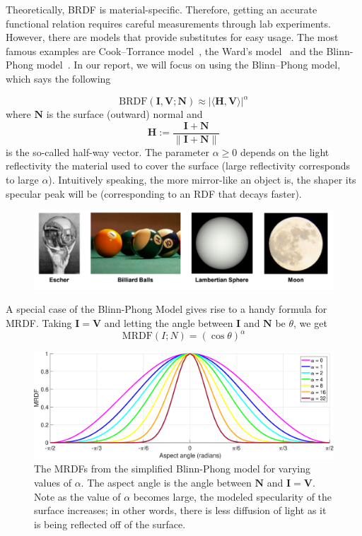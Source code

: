 \documentclass[11pt]{amsart}
\newcommand{\BRDF}{\mathrm{BRDF}}
\newcommand{\MRDF}{\mathrm{MRDF}}
\newcommand{\ip}[2]{\langle {#1}, {#2} \rangle}
\theoremstyle{definition}
\begin{document}
Theoretically, BRDF is material-specific. Therefore, getting an accurate functional
relation requires careful measurements through lab experiments. However, there
are models that provide substitutes for easy usage. The most famous examples
are Cook--Torrance model~\cite{CookTorr}, the Ward's model~\cite{Ward} and the
Blinn-Phong model~\cite{BlinnPhong}. In our report, we will focus on using the
Blinn--Phong model, which says the following

\[
   \BRDF(\mathbf{I},\mathbf{V};\mathbf{N})
   \approx
   |\ip{\mathbf{H}}{\mathbf{V}}|^\alpha
\]
where $\mathbf{N}$ is the surface (outward) normal and $$\mathbf{H}:=\frac{\mathbf{I}+\mathbf{N}} {\|\mathbf{I}+\mathbf{N}\|}$$
is the so-called half-way vector. The parameter $\alpha \geq 0$ depends on the light reflectivity the material used to cover the surface (large reflectivity corresponds to large $\alpha$). Intuitively speaking, the more mirror-like an object is,  the shaper its specular peak will be (corresponding to an RDF that decays faster). \begin{figure}[H]
 \includegraphics[width=1.1\textwidth]{./figs/surfaces.pdf}
\end{figure}


A special case of the Blinn-Phong Model gives rise to a handy formula for MRDF. Taking $\mathbf{I}=\mathbf{V}$ and letting the angle between $\mathbf{I}$ and $\mathbf{N}$ be $\theta$, we get
\[
\MRDF(I;N)=(\cos \theta)^\alpha
\]

\begin{figure}[H]
 \includegraphics[width=1\textwidth]{./figs/MRDFs.eps}
 \caption{The MRDFs from the simplified Blinn-Phong model for varying values of $\alpha$. The aspect angle is the angle between $\mathbf{N}$ and $\mathbf{I}=\mathbf{V}$. Note as the value of $\alpha$ becomes large, the modeled specularity of the surface increases; in other words, there is less diffusion of light as it is being reflected off of the surface.}
 \label{MRDFs}
\end{figure}
\end{document}
